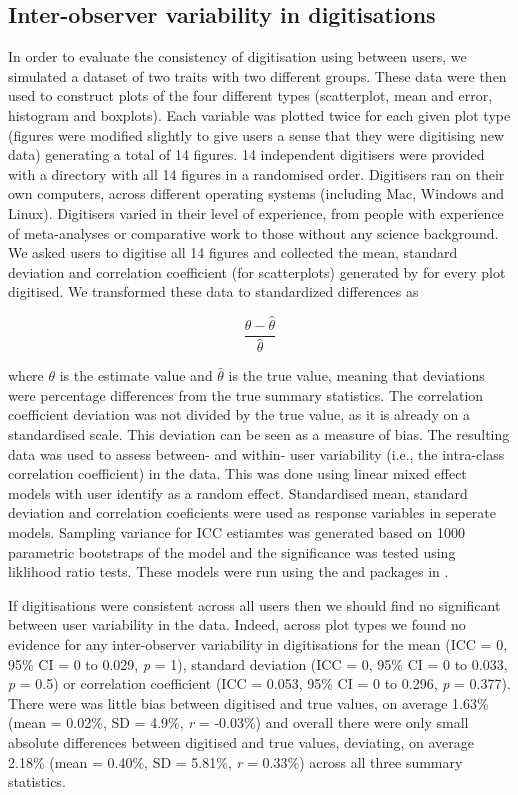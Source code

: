 \documentclass[article]{jss}
\newcommand{\fct}[1]{\code{#1()}}
\begin{document}
\subsection{Inter-observer variability in digitisations}
In order to evaluate the consistency of digitisation using  between users, we simulated a dataset of two traits with two different groups. These data were then used to construct plots of the four different types (scatterplot, mean and error, histogram and boxplots). Each variable was plotted twice for each given plot type (figures were modified slightly to give users a sense that they were digitising new data) generating a total of 14 figures. 14 independent digitisers were provided with a directory with all 14 figures in a randomised order. Digitisers ran  on their own computers, across different operating systems (including Mac, Windows and Linux). Digitisers varied in their level of experience, from people with experience of meta-analyses or comparative work to those without any science background. We asked users to digitise all 14 figures and collected the mean, standard deviation and correlation coefficient (for scatterplots) generated by \fct{metaDigitise} for every plot digitised. We transformed these data to standardized differences as

\begin{equation}
\frac{\theta - \hat{\theta}}{\hat{\theta}}
\end{equation}

where $\theta$ is the estimate value and $\hat{\theta}$ is the true value, meaning that deviations were percentage differences from the true summary statistics. The correlation coefficient deviation was not divided by the true value, as it is already on a standardised scale. This deviation can be seen as a measure of bias. The resulting data was used to assess between- and within- user variability (i.e., the intra-class correlation coefficient) in the data. This was done using linear mixed effect models with user identify as a random effect. Standardised mean, standard deviation and correlation coeficients were used as response variables in seperate models. Sampling variance for ICC estiamtes was generated based on 1000 parametric bootstraps of the model and the significance was tested using liklihood ratio tests. These models were run using the  \citep{bates2015} and  \citep{stoffel2017} packages in .  

If digitisations were consistent across all users then we should find no significant between user variability in the data. Indeed, across plot types we found no evidence for any inter-observer variability in digitisations for the mean (ICC = 0, 95\% CI = 0 to 0.029, \textit{p} = 1), standard deviation (ICC = 0, 95\% CI = 0 to 0.033, \textit{p} = 0.5) or correlation coefficient (ICC = 0.053, 95\% CI = 0 to 0.296, \textit{p} = 0.377). There were was little bias between digitised and true values, on average 1.63\% (mean = 0.02\%, SD = 4.9\%, \textit{r} = -0.03\%) and overall there were only small absolute differences between digitised and true values, deviating, on average 2.18\% (mean = 0.40\%, SD = 5.81\%, \textit{r} = 0.33\%) across all three summary statistics.
\end{document}
